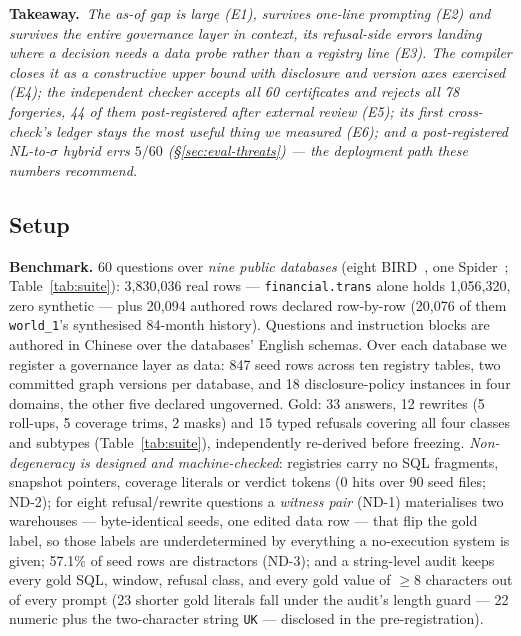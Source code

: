 \noindent{}\textbf{Takeaway.}\ \emph{The as-of gap is large (E1), survives
one-line prompting (E2) and survives the entire governance layer in context, its
refusal-side errors landing where a decision needs a data probe rather than a
registry line (E3). The compiler closes it as a constructive upper bound with disclosure
and version axes exercised (E4); the independent checker accepts all 60
certificates and rejects all 78 forgeries, 44 of them post-registered after
external review (E5); its first cross-check's
ledger stays the most useful thing we measured (E6); and a post-registered
NL-to-$\sigma$ hybrid errs $5/60$ (\S\ref{sec:eval-threats}) --- the
deployment path these numbers recommend.}

\subsection{Setup}
\label{sec:eval-setup}

\noindent{}\textbf{Benchmark.} 60 questions over \emph{nine public databases}
(eight BIRD~\cite{bird}, one Spider~\cite{spider}; Table~\ref{tab:suite}):
3{,}830{,}036 real rows --- \texttt{financial.trans} alone holds
1{,}056{,}320, zero synthetic --- plus 20{,}094 authored rows declared
row-by-row (20{,}076 of them \texttt{world\_1}'s synthesised 84-month
history). Questions and instruction blocks are authored in Chinese over the
databases' English schemas. Over each database we register a governance layer as data: 847
seed rows across ten registry tables, two committed graph versions
per database, and 18 disclosure-policy instances in four domains, the other
five declared ungoverned. Gold: 33 answers, 12 rewrites
(5 roll-ups, 5 coverage trims, 2 masks) and 15 typed refusals covering all four
classes and subtypes (Table~\ref{tab:suite}), independently re-derived before
freezing.
\emph{Non-degeneracy is designed and machine-checked}: registries carry no
SQL fragments, snapshot pointers, coverage literals or verdict tokens (0
hits over 90 seed files; ND-2); for eight refusal/rewrite questions a
\emph{witness pair} (ND-1) materialises two warehouses --- byte-identical
seeds,
one edited data row --- that flip the gold label, so those labels are
underdetermined by everything a no-execution system is given; 57.1\% of
seed rows are distractors (ND-3); and a string-level audit keeps every gold
SQL, window, refusal class, and every gold value of $\geq$8 characters out
of every prompt (23 shorter gold literals fall under the audit's
length guard --- 22 numeric plus the two-character string \texttt{UK} ---
disclosed in the pre-registration).

